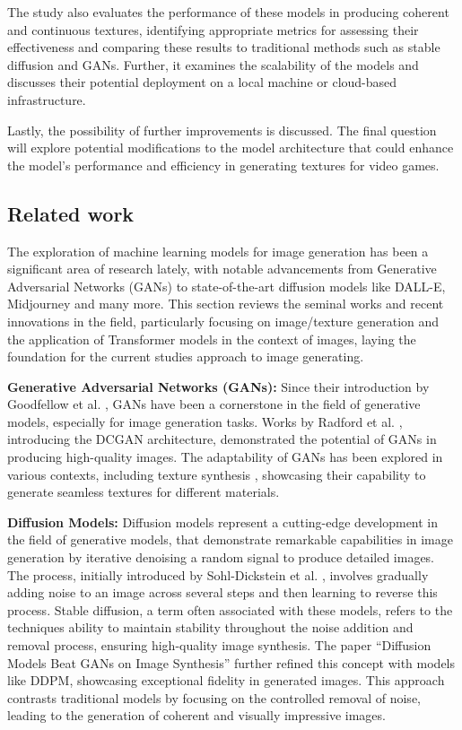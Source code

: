The study also evaluates the performance of these models in producing coherent and continuous textures, identifying appropriate metrics for assessing their effectiveness and comparing these results to traditional methods such as stable diffusion and GANs. Further, it examines the scalability of the models and discusses their potential deployment on a local machine or cloud-based infrastructure.

Lastly, the possibility of further improvements is discussed. The final question will explore potential modifications to the model architecture that could enhance the model's performance and efficiency in generating textures for video games.

\subsection{Related work}
    
The exploration of machine learning models for image generation has been a significant area of research lately, with notable advancements from Generative Adversarial Networks (GANs) to state-of-the-art diffusion models like DALL-E, Midjourney and many more. This section reviews the seminal works and recent innovations in the field, particularly focusing on image/texture generation and the application of Transformer models in the context of images, laying the foundation for the current studies approach to image generating.

\textbf{Generative Adversarial Networks (GANs):} 
Since their introduction by Goodfellow et al. \autocite{goodfellow2014generative}, GANs have been a cornerstone in the field of generative models, especially for image generation tasks. Works by Radford et al. \autocite{radford2016unsupervised}, introducing the DCGAN architecture, demonstrated the potential of GANs in producing high-quality images. The adaptability of GANs has been explored in various contexts, including texture synthesis \autocite{xian2018texturegan}, showcasing their capability to generate seamless textures for different materials.

\textbf{Diffusion Models:} 
Diffusion models represent a cutting-edge development in the field of generative models, that demonstrate remarkable capabilities in image generation by iterative denoising a random signal to produce detailed images. The process, initially introduced by Sohl-Dickstein et al. \autocite{sohldickstein2015deep}, involves gradually adding noise to an image across several steps and then learning to reverse this process. Stable diffusion, a term often associated with these models, refers to the techniques ability to maintain stability throughout the noise addition and removal process, ensuring high-quality image synthesis. The paper \enquote{Diffusion Models Beat GANs on Image Synthesis} \autocite{dhariwal2021diffusion} further refined this concept with models like DDPM, showcasing exceptional fidelity in generated images. This approach contrasts traditional models by focusing on the controlled removal of noise, leading to the generation of coherent and visually impressive images.

